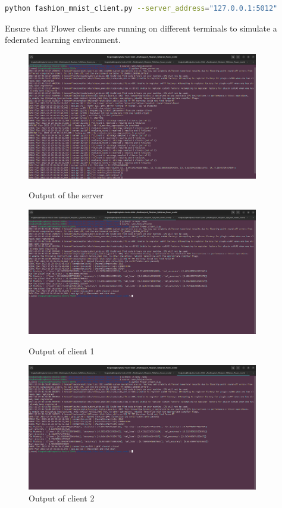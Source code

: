 \documentclass{article}
\begin{document}
\begin{lstlisting}[language=sh, caption={Starting Flower Clients}]
python fashion_mnist_client.py --server_address="127.0.0.1:5012"
\end{lstlisting}

Ensure that Flower clients are running on different terminals to simulate a federated learning environment.

\begin{figure}[h]
    \centering
    \includegraphics[width=0.9\textwidth]{server.png}
    \caption{Output of the server}
    \label{Output of the server}
    
    \vspace{\floatsep} %
    
    \includegraphics[width=0.9\textwidth]{client_1.png}
    \caption{Output of client 1}
    \label{Output of client 1}
    
    \vspace{\floatsep} %
    
    \includegraphics[width=0.9\textwidth]{client_2.png}
    \caption{Output of client 2}
    \label{Output of client 2}
\end{figure}
\end{document}
